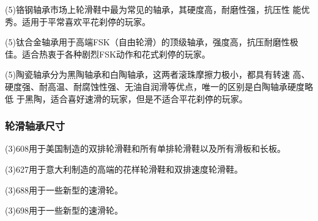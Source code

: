 \documentclass[12pt]{ctexart}
\begin{document}
\bsctype(5){铬钢轴承}市场上轮滑鞋中最为常见的轴承，其硬度高，耐磨性强，抗压性
能优秀。适用于平常喜欢平花刹停的玩家。

\bsctype(5){钛合金轴承}用于高端FSK（自由轮滑）的顶级轴承，强度高，抗压耐磨性极
佳。适合热衷于各种剧烈FSK动作和花式刹停的玩家。

\bsctype(5){陶瓷轴承}分为黑陶轴承和白陶轴承，这两者滚珠摩擦力极小，都具有转速
高、硬度强、耐高温、耐腐蚀性强、无油自润滑等优点，唯一的区别是白陶轴承硬度略低
于黑陶，适合喜好速滑的玩家，但是不适合平花刹停的玩家。

\subsubsection{轮滑轴承尺寸}

\bsctype(3){608}用于美国制造的双排轮滑鞋和所有单排轮滑鞋以及所有滑板和长板。

\bsctype(3){627}用于意大利制造的高端的花样轮滑鞋和双排速度轮滑鞋。

\bsctype(3){688}用于一些新型的速滑轮。

\bsctype(3){698}用于一些新型的速滑轮。
\end{document}
